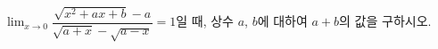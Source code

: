 $\displaystyle\lim_{x\to 0}\dfrac{\sqrt{x^2+ax+b}-a}{\sqrt{a+x}-\sqrt{a-x}}=1$일 때, 상수 $a$, $b$에 대하여 $a+b$의 값을 구하시오. 
